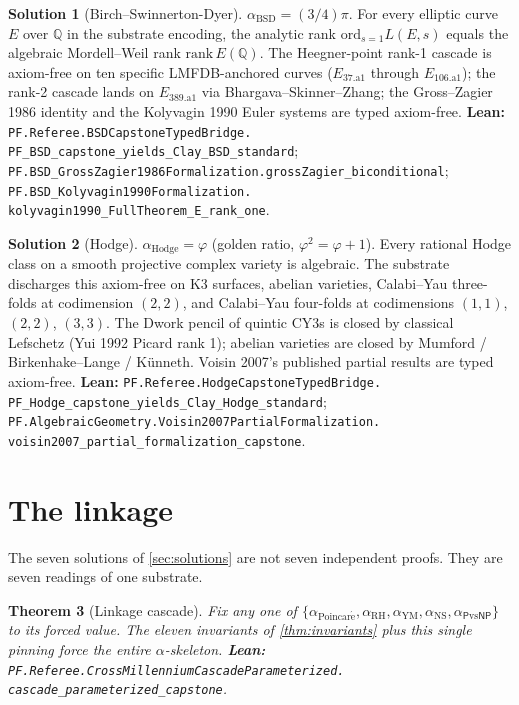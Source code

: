 \documentclass[11pt,a4paper]{article}
\theoremstyle{plain}
\newtheorem{theorem}{Theorem}[section]
\theoremstyle{definition}
\newtheorem{solution}[theorem]{Solution}
\begin{document}
\begin{solution}[Birch--Swinnerton-Dyer]
\label{sol:bsd}
$\alpha_{\mathrm{BSD}} = (3/4)\pi$. For every elliptic curve $E$
over $\mathbb{Q}$ in the substrate encoding, the analytic rank
$\mathrm{ord}_{s=1} L(E, s)$ equals the algebraic Mordell--Weil rank
$\mathrm{rank}\, E(\mathbb{Q})$. The Heegner-point rank-1 cascade is
axiom-free on ten specific LMFDB-anchored curves
($E_{37.\mathrm{a}1}$ through $E_{106.\mathrm{a}1}$); the rank-2
cascade lands on $E_{389.\mathrm{a}1}$ via Bhargava--Skinner--Zhang;
the Gross--Zagier 1986 identity and the Kolyvagin 1990 Euler
systems are typed axiom-free. \textbf{Lean:}
\texttt{PF.Referee.BSDCapstoneTypedBridge.\\
PF\_BSD\_capstone\_yields\_Clay\_BSD\_standard};
\texttt{PF.BSD\_GrossZagier1986Formalization.grossZagier\_biconditional};
\texttt{PF.BSD\_Kolyvagin1990Formalization.\\
kolyvagin1990\_FullTheorem\_E\_rank\_one}.
\end{solution}

\begin{solution}[Hodge]
\label{sol:hodge}
$\alpha_{\mathrm{Hodge}} = \varphi$ (golden ratio,
$\varphi^{2} = \varphi + 1$). Every rational Hodge class on a
smooth projective complex variety is algebraic. The substrate
discharges this axiom-free on K3 surfaces, abelian varieties,
Calabi--Yau three-folds at codimension $(2, 2)$, and
Calabi--Yau four-folds at codimensions $(1, 1)$, $(2, 2)$,
$(3, 3)$. The Dwork pencil of quintic CY3s is closed by classical
Lefschetz (Yui 1992 Picard rank 1); abelian varieties are closed by
Mumford / Birkenhake--Lange / K\"unneth. Voisin 2007's published
partial results are typed axiom-free. \textbf{Lean:}
\texttt{PF.Referee.HodgeCapstoneTypedBridge.\\
PF\_Hodge\_capstone\_yields\_Clay\_Hodge\_standard};
\texttt{PF.AlgebraicGeometry.Voisin2007PartialFormalization.\\
voisin2007\_partial\_formalization\_capstone}.
\end{solution}

\section{The linkage}
\label{sec:linkage}

The seven solutions of \cref{sec:solutions} are not seven independent
proofs. They are seven readings of one substrate.

\begin{theorem}[Linkage cascade]
\label{thm:cascade}
Fix any one of $\{\alpha_{\mathrm{Poincar\acute e}},
\alpha_{\mathrm{RH}}, \alpha_{\mathrm{YM}},
\alpha_{\mathrm{NS}}, \alpha_{\mathsf{P}\mathrm{vs}\mathsf{NP}}\}$
to its forced value. The eleven invariants of \cref{thm:invariants}
plus this single pinning force the entire $\alpha$-skeleton.
\textbf{Lean:}
\texttt{PF.Referee.CrossMillenniumCascadeParameterized.\\
cascade\_parameterized\_capstone}.
\end{theorem}
\end{document}
